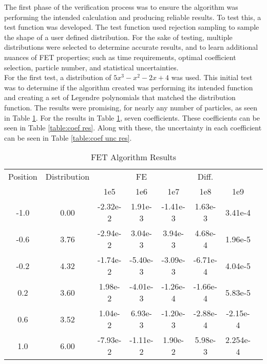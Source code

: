 \documentclass[10tma4paper]{article}
\begin{document}
The first phase of the verification process was to ensure the algorithm was performing the intended calculation and producing reliable results. To test this, a test function was developed. The test function used rejection sampling to sample the shape of a user defined distribution. For the sake of testing, multiple distributions were selected to determine accurate results, and to learn additional nuances of FET properties; such as time requirements, optimal coefficient selection, particle number, and statistical uncertainties.
\\
For the first test, a distribution of $5x^{3}-x^{2}-2x+4$ was used. This initial test was to determine if the algorithm created was performing its intended function and creating a set of Legendre polynomials that matched the distribution function. The results were promising, for nearly any number of particles, as seen in Table \ref{table:alg res}. For the results in Table \ref{table:alg res}, seven coefficients. These coefficients can be seen in Table \ref{table:coef res}. Along with these, the uncertainty in each coefficient can be seen in Table \ref{table:coef unc res}.
\begin{table}[!htbp]
	\caption{FET Algorithm Results}
	\centering
	\begin{tabular}{c c c c c c c c}
		\hline
		Position & Distribution &  & FE &  & Diff. &  &\\[0.5ex]
		 & & 1e5 & 1e6 & 1e7 & 1e8 & 1e9 &\\
		 \hline
		 \hline
		-1.0 & 0.00 & -2.32e-2 & 1.91e-3  & -1.41e-3 & 1.63e-3  & 3.41e-4  & \\
		-0.6 & 3.76 & -2.94e-2 & 3.04e-3  & 3.94e-3  & 4.68e-4  & 1.96e-5  & \\
		-0.2 & 4.32 & -1.74e-2 & -5.40e-3 & -3.09e-3 & -6.71e-4 & 4.04e-5  & \\
		 0.2 & 3.60 & 1.98e-2  & -4.01e-3 & -1.26e-4 & -1.66e-4 & 5.83e-5  & \\
		 0.6 & 3.52 & 1.04e-2  & 6.93e-3  & -1.20e-3 & -2.88e-4 & -2.15e-4 & \\
		 1.0 & 6.00 & -7.93e-2 & -1.11e-2 & 1.90e-2  & 5.98e-3  & 2.254e-4 & \\ [1ex]
		\hline
	\end{tabular}
	\label{table:alg res}
\end{table}
\end{document}
